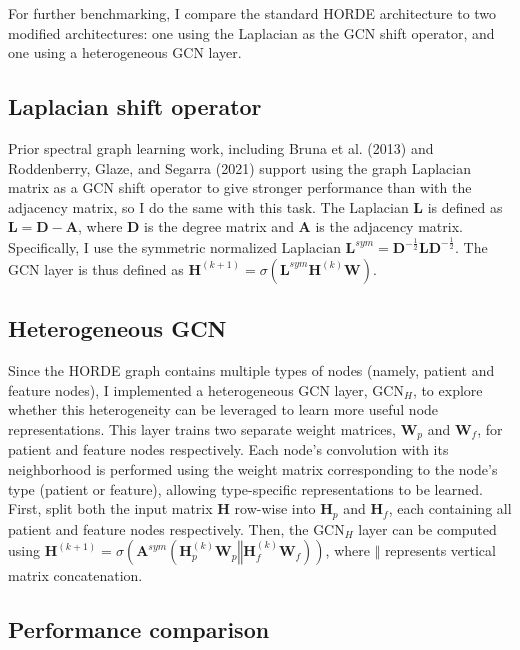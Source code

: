 \documentclass{article}
\begin{document}
For further benchmarking, I compare the standard HORDE architecture to two modified architectures: one using the Laplacian as the GCN shift operator, and one using a heterogeneous GCN layer. 

\subsection{Laplacian shift operator}

Prior spectral graph learning work, including Bruna et al. (2013) and Roddenberry, Glaze, and Segarra (2021) support using the graph Laplacian matrix as a GCN shift operator to give stronger performance than with the adjacency matrix, so I do the same with this task. The Laplacian $\textbf{L}$ is defined as $\textbf{L} = \textbf{D} - \textbf{A}$, where $\textbf{D}$ is the degree matrix and $\textbf{A}$ is the adjacency matrix. Specifically, I use the symmetric normalized Laplacian $\textbf{L}^{sym} = \textbf{D}^{-\frac{1}{2}}\textbf{LD}^{-\frac{1}{2}}$. The GCN layer is thus defined as $\textbf{H}^{(k+1)} = \sigma(\textbf{L}^{sym}\textbf{H}^{(k)}\textbf{W})$.


\subsection{Heterogeneous GCN}
Since the HORDE graph contains multiple types of nodes (namely, patient and feature nodes), I implemented a heterogeneous GCN layer, GCN$_H$, to explore whether this heterogeneity can be leveraged to learn more useful node representations. This layer trains two separate weight matrices, \textbf{ W}$_p$ and \textbf{W}$_f$, for patient and feature nodes respectively. Each node's convolution with its neighborhood is performed using the weight matrix corresponding to the node's type (patient or feature), allowing type-specific representations to be learned. First,  split both the input matrix \textbf{H} row-wise into \textbf{H}$_p$ and \textbf{H}$_f$, each containing all patient and feature nodes respectively. Then, the GCN$_H$ layer can be computed using $\textbf{H}^{(k+1)} = \sigma(\textbf{A}^{sym}(\textbf{H}_p^{(k)}\textbf{W}_p \mathbin\Vert \textbf{H}_f^{(k)}\textbf{W}_f))$, where $\mathbin\Vert$ represents vertical matrix concatenation.

\subsection{Performance comparison}
\end{document}
